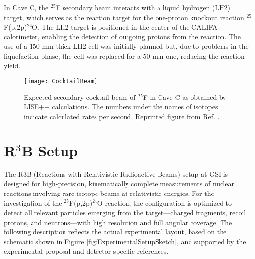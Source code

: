 In Cave C, the $^{25}$F secondary beam interacts with a liquid hydrogen (LH2) target, which serves as the reaction target for the one-proton knockout reaction $^{25}$F(p,2p)$^{24}$O. The LH2 target is positioned in the center of the CALIFA calorimeter, enabling the detection of outgoing protons from the reaction. The use of a 150 mm thick LH2 cell was initially planned but, due to problems in the liquefaction phase, the cell was replaced for a 50 mm one, reducing the reaction yield. 


\begin{figure}
	\centering
	\texttt{[image: CocktailBeam]}
	\caption{Expected secondary cocktail beam of $^{25}$F in Cave C as obtained by LISE++ calculations. The numbers under the names of isotopes indicate calculated rates per second. Reprinted figure from Ref. \cite{panin2024neutron}.}
	\label{fig:CocktailBeam}
\end{figure}


\section{R$^3$B Setup}


The \gls{R3B} (Reactions with Relativistic Radioactive Beams) setup at GSI is designed for high-precision, kinematically complete measurements of nuclear reactions involving rare isotope beams at relativistic energies. For the investigation of the $^{25}$F(p,2p)$^{24}$O reaction, the configuration is optimized to detect all relevant particles emerging from the target—charged fragments, recoil protons, and neutrons—with high resolution and full angular coverage. The following description reflects the actual experimental layout, based on the schematic shown in Figure \ref{fig:ExperimentalSetupSketch}, and supported by the experimental proposal and detector-specific references.

